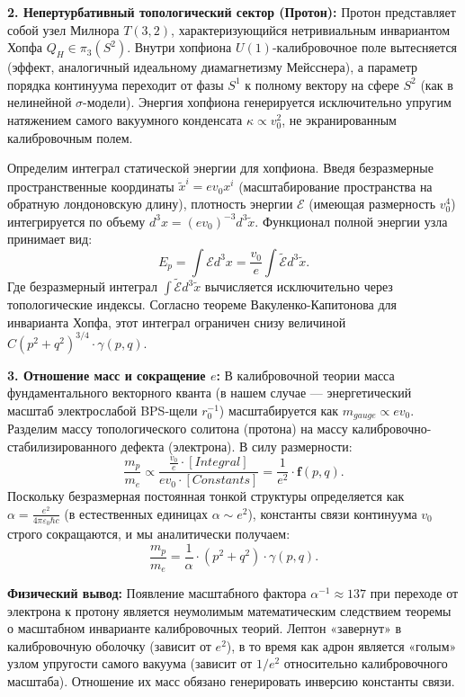 \documentclass[12pt,a4paper]{article}
\begin{document}
\textbf{2. Непертурбативный топологический сектор (Протон):}
Протон представляет собой узел Милнора $T(3,2)$, характеризующийся нетривиальным инвариантом Хопфа $Q_H \in \pi_3(S^2)$. 
Внутри хопфиона $U(1)$-калибровочное поле вытесняется (эффект, аналогичный идеальному диамагнетизму Мейсснера), а параметр порядка континуума переходит от фазы $S^1$ к полному вектору на сфере $S^2$ (как в нелинейной $\sigma$-модели). Энергия хопфиона генерируется исключительно упругим натяжением самого вакуумного конденсата $\kappa \propto v_0^2$, не экранированным калибровочным полем.

Определим интеграл статической энергии для хопфиона. Введя безразмерные пространственные координаты $\tilde{x}^i = e v_0 x^i$ (масштабирование пространства на обратную лондоновскую длину), плотность энергии $\mathcal{E}$ (имеющая размерность $v_0^4$) интегрируется по объему $d^3x = (e v_0)^{-3} d^3\tilde{x}$.
Функционал полной энергии узла принимает вид:
\begin{equation}
	E_p = \int \mathcal{E} d^3x = \frac{v_0}{e} \int \tilde{\mathcal{E}} d^3\tilde{x}.
\end{equation}
Где безразмерный интеграл $\int \tilde{\mathcal{E}} d^3\tilde{x}$ вычисляется исключительно через топологические индексы. Согласно теореме Вакуленко-Капитонова для инварианта Хопфа, этот интеграл ограничен снизу величиной $C (p^2+q^2)^{3/4} \cdot \gamma(p,q)$.

\textbf{3. Отношение масс и сокращение $e$:}
В калибровочной теории масса фундаментального векторного кванта (в нашем случае — энергетический масштаб электрослабой BPS-щели $r_0^{-1}$) масштабируется как $m_{gauge} \propto e v_0$.
Разделим массу топологического солитона (протона) на массу калибровочно-стабилизированного дефекта (электрона). В силу размерности:
\begin{equation}
	\frac{m_p}{m_e} \propto \frac{\frac{v_0}{e} \cdot [Integral]}{e v_0 \cdot [Constants]} = \frac{1}{e^2} \cdot \mathbf{f}(p,q).
\end{equation}
Поскольку безразмерная постоянная тонкой структуры определяется как $\alpha = \frac{e^2}{4\pi\varepsilon_0 \hbar c}$ (в естественных единицах $\alpha \sim e^2$), константы связи континуума $v_0$ строго сокращаются, и мы аналитически получаем:
\begin{equation}
	\frac{m_p}{m_e} = \frac{1}{\alpha} \cdot (p^2+q^2) \cdot \gamma(p,q).
\end{equation}

\textbf{Физический вывод:} Появление масштабного фактора $\alpha^{-1} \approx 137$ при переходе от электрона к протону является неумолимым математическим следствием теоремы о масштабном инварианте калибровочных теорий. Лептон «завернут» в калибровочную оболочку (зависит от $e^2$), в то время как адрон является «голым» узлом упругости самого вакуума (зависит от $1/e^2$ относительно калибровочного масштаба). Отношение их масс обязано генерировать инверсию константы связи.
\end{document}
